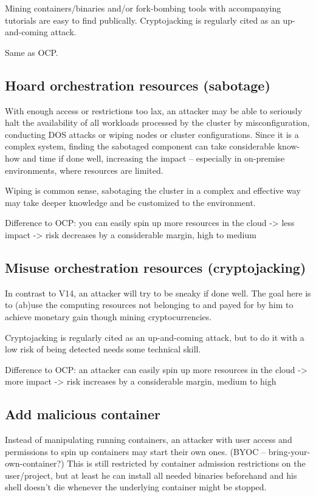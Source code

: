 Mining containers/binaries and/or fork-bombing tools with accompanying tutorials are easy to find publically. Cryptojacking is regularly cited as an up-and-coming attack.

Same as OCP.

\subsection{Hoard orchestration resources (sabotage)}
With enough access or restrictions too lax, an attacker may be able to seriously halt the availability of all workloads processed by the cluster by misconfiguration, conducting DOS attacks or wiping nodes or cluster configurations. Since it is a complex system, finding the sabotaged component can take considerable know-how and time if done well, increasing the impact – especially in on-premise environments, where resources are limited.

Wiping is common sense, sabotaging the cluster in a complex and effective way may take deeper knowledge and be customized to the environment.

Difference to OCP: you can easily spin up more resources in the cloud -> less impact
-> risk decreases by a considerable margin, high to medium

\subsection{Misuse orchestration resources (cryptojacking)}
In contrast to V14, an attacker will try to be sneaky if done well.
The goal here is to (ab)use the computing resources not belonging to and payed for by him to achieve monetary gain though mining cryptocurrencies.

Cryptojacking is regularly cited as an up-and-coming attack, but to do it with a low risk of being detected needs some technical skill.

Difference to OCP: an attacker can easily spin up more resources in the cloud -> more impact
-> risk increases by a considerable margin, medium to high

\subsection{Add malicious container}
Instead of manipulating running containers, an attacker with user access and permissions to spin up containers may start their own ones. (BYOC – bring-your-own-container?)
This is still restricted by container admission restrictions on the user/project, but at least he can install all needed binaries beforehand and his shell doesn’t die whenever the underlying container might be stopped.

